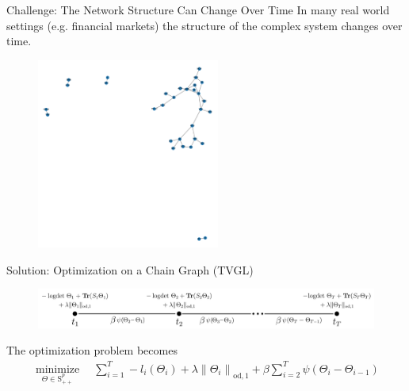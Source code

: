 \documentclass{beamer}
\begin{document}
\begin{frame}{Challenge: The Network Structure Can Change Over Time}
    In many real world settings (e.g. financial markets) the structure of the complex system changes over time.
    \begin{figure}
       \includegraphics[width=6cm]{NetworkGraph.png}
       \caption{}
       \label{fig:network_evolution}
  \end{figure}
\end{frame}

\begin{frame}{Solution: Optimization on a Chain Graph (TVGL)}
    \begin{figure}
       \includegraphics[width=12cm]{chain_graph.png}
       \caption{\cite{hallac2017network}}
       \label{fig:chain_graph}
  \end{figure}
    The optimization problem becomes
    \begin{align*}
        \underset{\Theta \in \mathrm{S}_{++}^{p}}{\operatorname{minimize}} \quad \sum_{i=1}^{T}-l_{i}\left(\Theta_{i}\right)+\lambda\left\|\Theta_{i}\right\|_{\mathrm{od}, 1}+\beta \sum_{i=2}^{T} \psi\left(\Theta_{i}-\Theta_{i-1}\right)
    \end{align*}
\end{frame}
\end{document}
